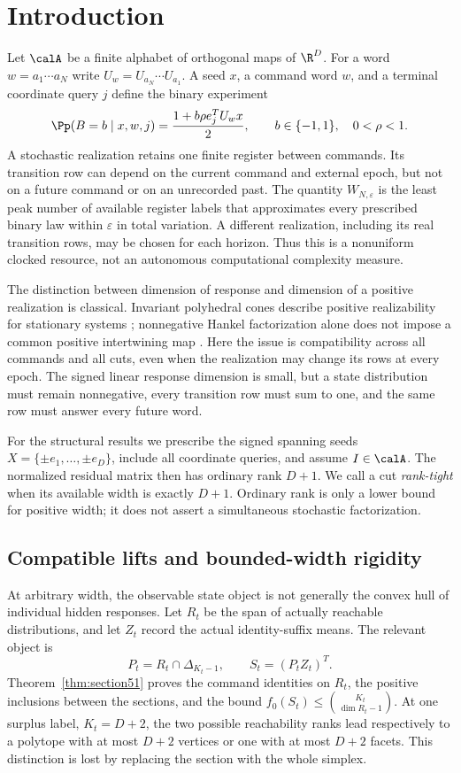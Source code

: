 \section{Introduction}\label{sec:introduction51}
Let $\calA$ be a finite alphabet of orthogonal maps of $\R^D$.
For a word $w=a_1\cdots a_N$ write $U_w=U_{a_N}\cdots U_{a_1}$.
A seed $x$, a command word $w$, and a terminal coordinate query $j$
define the binary experiment
\begin{equation}\label{eq:target}
 \Pp(B=b\mid x,w,j)=\frac{1+b\rho e_j^TU_wx}{2},
 \qquad b\in\{-1,1\},\quad 0<\rho<1.
\end{equation}
A stochastic realization retains one finite register between commands.
Its transition row can depend on the current command and external
epoch, but not on a future command or on an unrecorded past. The
quantity $W_{N,\varepsilon}$ is the least peak number of available
register labels that approximates every prescribed binary law within
$\varepsilon$ in total variation. A different realization, including
its real transition rows, may be chosen for each horizon. Thus this
is a nonuniform clocked resource, not an autonomous computational
complexity measure.

The distinction between dimension of response and dimension of a
positive realization is classical. Invariant polyhedral cones describe
positive realizability for stationary systems \cite{BF04}; nonnegative
Hankel factorization alone does not impose a common positive
intertwining map \cite{BF03}. Here the issue is compatibility across
all commands and all cuts, even when the realization may change its
rows at every epoch. The signed linear response dimension is small,
but a state distribution must remain nonnegative, every transition
row must sum to one, and the same row must answer every future word.

For the structural results we prescribe the signed spanning seeds
$X=\{\pm e_1,\ldots,\pm e_D\}$, include all coordinate queries, and
assume $I\in\calA$. The normalized residual matrix then has ordinary
rank $D+1$. We call a cut \emph{rank-tight} when its available width
is exactly $D+1$. Ordinary rank is only a lower bound for positive
width; it does not assert a simultaneous stochastic factorization.

\subsection{Compatible lifts and bounded-width rigidity}
At arbitrary width, the observable state object is not generally the
convex hull of individual hidden responses. Let $R_t$ be the span of
actually reachable distributions, and let $Z_t$ record the actual
identity-suffix means. The relevant object is
\[
       P_t=R_t\cap\Delta_{K_t-1},\qquad S_t=(P_tZ_t)^T.
\]
Theorem~\ref{thm:section51} proves the command identities on $R_t$,
the positive inclusions between the sections, and the bound
$f_0(S_t)\le\binom{K_t}{\dim R_t-1}$. At one surplus label,
$K_t=D+2$, the two possible reachability ranks lead respectively to a
polytope with at most $D+2$ vertices or one with at most $D+2$ facets.
This distinction is lost by replacing the section with the whole
simplex.


